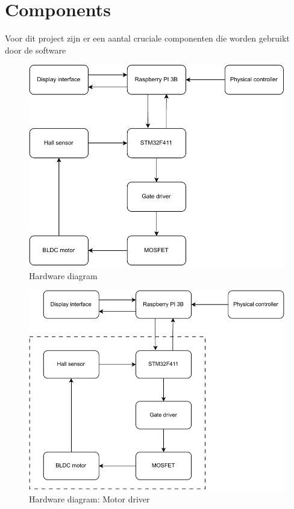 \section{Components}
Voor dit project zijn er een aantal cruciale componenten die worden gebruikt door de software
\begin{figure}[H]
    \centering
    \includegraphics[width=1\textwidth]{img/DrawIO/Componentdiagram.pdf}
    \caption{Hardware diagram}
    \label{fig:Hardware_Diagram}
\end{figure}

\begin{figure}[H]
    \centering
    \includegraphics[width=1\textwidth]{img/DrawIO/Motordriver.pdf}
    \caption{Hardware diagram: Motor driver}
    \label{fig:Hardware_Diagram_Motor_driver}
\end{figure}

